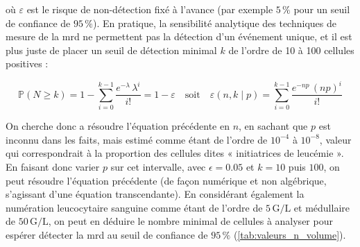 où $\varepsilon$ est le risque de non-détection fixé à l'avance (par exemple $5\,\%$ pour un seuil de confiance de $95\,\%$).
En pratique, la sensibilité analytique des techniques de mesure de la \gls{mrd} ne permettent pas la détection d'un événement unique, et il est plus juste de placer 
un seuil de détection minimal $k$ de l'ordre de 10 à 100 cellules positives : 

\begin{equation}
    \mathbb{P}(N \geq k) = 1 - \sum_{i = 0}^{k-1} \frac{e^{-\lambda} \, \lambda^{i}}{i!} = 1 - \varepsilon
    \quad \text{soit} \quad \varepsilon(n,k \mid p) = \sum_{i = 0}^{k-1} \frac{e^{-np} \, (np)^{i}}{i!}
\end{equation}

On cherche donc a résoudre l'équation précédente en $n$, en sachant que $p$ est inconnu dans les faits, mais estimé comme étant de l'ordre de $10^{-4}$ à $10^{-8}$, 
valeur qui correspondrait à la proportion des cellules dites « initiatrices de leucémie ». En faisant donc varier $p$ sur cet intervalle, avec $\epsilon = 0.05$ et 
$k = 10$ puis $100$, on peut résoudre l'équation précédente (de façon numérique et non algébrique, s'agissant d'une équation transcendante). En considérant également 
la numération leucocytaire sanguine comme étant de l'ordre de $5\,\text{G/L}$ et médullaire de $50\,\text{G/L}$, on peut en déduire le nombre minimal de cellules à analyser 
pour espérer détecter la \gls{mrd} au seuil de confiance de $95\,\%$ (\autoref{tab:valeurs_n_volume}).


